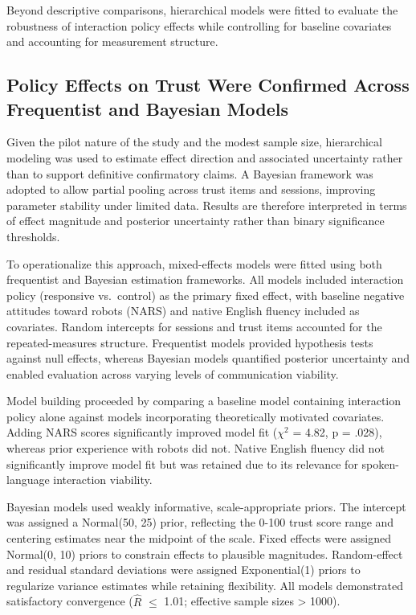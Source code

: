 \documentclass[
  authoryear,
  doubleblind,
  3p]{elsarticle}
\begin{document}
Beyond descriptive comparisons, hierarchical models were fitted to
evaluate the robustness of interaction policy effects while controlling
for baseline covariates and accounting for measurement structure.

\subsection{Policy Effects on Trust Were Confirmed Across Frequentist
and Bayesian
Models}\label{policy-effects-on-trust-were-confirmed-across-frequentist-and-bayesian-models}

Given the pilot nature of the study and the modest sample size,
hierarchical modeling was used to estimate effect direction and
associated uncertainty rather than to support definitive confirmatory
claims. A Bayesian framework was adopted to allow partial pooling across
trust items and sessions, improving parameter stability under limited
data. Results are therefore interpreted in terms of effect magnitude and
posterior uncertainty rather than binary significance thresholds.

To operationalize this approach, mixed-effects models were fitted using
both frequentist and Bayesian estimation frameworks. All models included
interaction policy (responsive vs.~control) as the primary fixed effect,
with baseline negative attitudes toward robots (NARS) and native English
fluency included as covariates. Random intercepts for sessions and trust
items accounted for the repeated-measures structure. Frequentist models
provided hypothesis tests against null effects, whereas Bayesian models
quantified posterior uncertainty and enabled evaluation across varying
levels of communication viability.

Model building proceeded by comparing a baseline model containing
interaction policy alone against models incorporating theoretically
motivated covariates. Adding NARS scores significantly improved model
fit (\(\chi^2\) = 4.82, p = .028), whereas prior experience with robots
did not. Native English fluency did not significantly improve model fit
but was retained due to its relevance for spoken-language interaction
viability.

Bayesian models used weakly informative, scale-appropriate priors. The
intercept was assigned a Normal(50, 25) prior, reflecting the 0-100
trust score range and centering estimates near the midpoint of the
scale. Fixed effects were assigned Normal(0, 10) priors to constrain
effects to plausible magnitudes. Random-effect and residual standard
deviations were assigned Exponential(1) priors to regularize variance
estimates while retaining flexibility. All models demonstrated
satisfactory convergence (\(\hat{R}\) \(\leq\) 1.01; effective sample
sizes \textgreater{} 1000).
\end{document}
